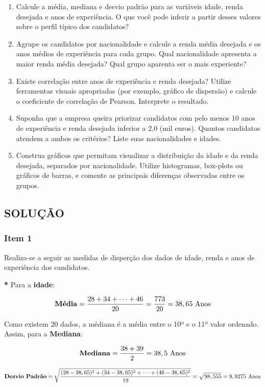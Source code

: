\documentclass[a4paper,11pt]{article}
\begin{document}
\begin{enumerate} 
\item Calcule a média, mediana e desvio padrão para as variáveis idade, renda desejada e anos de experiência. O que você pode inferir a partir desses valores sobre o perfil típico dos candidatos?
\item Agrupe os candidatos por nacionalidade e calcule a renda média desejada e os anos médios de experiência para cada grupo. Qual nacionalidade apresenta a maior renda média desejada? Qual grupo aparenta ser o mais experiente?
\item Existe correlação entre anos de experiência e renda desejada? Utilize ferramentas visuais apropriadas (por exemplo, gráfico de dispersão) e calcule o coeficiente de correlação de Pearson. Interprete o resultado. 
\item Suponha que a empresa queira priorizar candidatos com pelo menos 10 anos de experiência e renda desejada inferior a 2,0 (mil euros). Quantos candidatos atendem a ambos os critérios? Liste suas nacionalidades e idades.
\item Construa gráficos que permitam visualizar a distribuição da idade e da renda desejada, separados por nacionalidade. Utilize histogramas, box-plots ou gráficos de barras, e comente as principais diferenças observadas entre os grupos.
\end{enumerate}

\subsection{\textbf{SOLUÇÃO}}

\subsubsection{Item 1}

Realiza-se a seguir as medidas de disperção dos dados de idade, renda e anos de experiência dos candidatos.

\textbf{*} Para a \textbf{idade}:

\[
\text{\textbf{Média}} =  \frac{28 + 34 + \cdots + 46}{20} =  \frac{773}{20} = 38,65 \text{ Anos}
\]
    
Como existem 20 dados, a médiana é a média entre o 10º e o 11º valor ordenado. Assim, para a \textbf{Mediana}:

\[
\text{\textbf{Mediana}} = \frac{38 + 39}{2} = 38,5 \text{ Anos}
\]


\[
\text{\textbf{Desvio Padrão}} = \sqrt{\frac{(28-38,65)^2 + (34-38,65)^2 + \cdots + (46-38,65)^2}{19}} = \sqrt{98,555} = 9,9275 \text{ Anos}
\]
\end{document}
